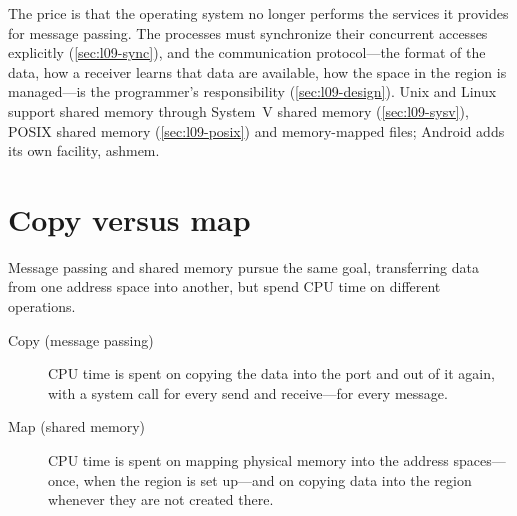 \documentclass[../main.tex]{subfiles}
\begin{document}
The price is that the operating system no longer performs the services it
provides for message passing.  The processes must synchronize their
concurrent accesses explicitly (\cref{sec:l09-sync}), and the communication
protocol---the format of the data, how a receiver learns that data are
available, how the space in the region is managed---is the programmer's
responsibility (\cref{sec:l09-design}).  Unix and Linux support shared
memory through System~V shared memory (\cref{sec:l09-sysv}), POSIX shared
memory (\cref{sec:l09-posix}) and memory-mapped files; Android adds its own
facility, ashmem.

\section{Copy versus map}
\label{sec:l09-copy-map}

Message passing and shared memory pursue the same goal, transferring data
from one address space into another, but spend CPU time on different
operations.
\begin{description}
  \item[Copy (message passing)] CPU time is spent on copying the data into
    the port and out of it again, with a system call for every send and
    receive---for every message.
  \item[Map (shared memory)] CPU time is spent on mapping physical memory
    into the address spaces---once, when the region is set up---and on
    copying data into the region whenever they are not created there.
\end{description}
\end{document}
